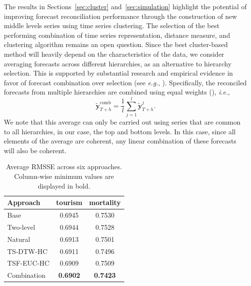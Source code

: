 \documentclass[a4paper,review,12pt,authoryear]{elsarticle}
\begin{document}
The results in Sections~\ref{sec:cluster} and~\ref{sec:simulation} highlight the potential of improving forecast reconciliation performance through the construction of new middle levels series using time series clustering. The selection of the best performing combination of time series representation, distance measure, and clustering algorithm remains an open question. Since the best cluster-based method will heavily depend on the characteristics of the data, %
we consider averaging forecasts across different hierarchies, as an alternative to hierarchy selection. This is supported by substantial research and empirical evidence in favor of forecast combination over selection (see \textit{e.g.}, \citealp{elliottForecastingEconomicsFinance2016}). Specifically, the reconciled forecasts from multiple hierarchies are combined using equal weights (\citealp{wangForecastCombinations50year2022}), \textit{i.e.},
\[
  \tilde{\boldsymbol{y}}_{T+h}^{\text{comb}} = \frac{1}{l} \sum_{j=1}^l \tilde{\boldsymbol{y}}_{T+h}^j.
\] 
We note that this average can only be carried out using series that are common to all hierarchies, in our case, the top and bottom levels. In this case, since all elements of the average are coherent, any linear combination of these forecasts will also be coherent. 



\begin{table}
    \centering
    \caption{\label{tab:P4_RMSSE}Average RMSSE across six approaches. Column-wise minimum values are displayed in bold.}
    \begin{tabular}{lcc}\toprule
       Approach & tourism & mortality \\ \midrule
        Base & 0.6945 & 0.7530 \\ 
        Two-level & 0.6944 & 0.7528 \\ 
        Natural & 0.6913 & 0.7501 \\ 
        TS-DTW-HC & 0.6911 & 0.7496 \\ 
        TSF-EUC-HC & 0.6909 & 0.7509 \\ 
        Combination & \textbf{0.6902} & \textbf{0.7423} \\ \bottomrule
    \end{tabular}
\end{table}
\end{document}
